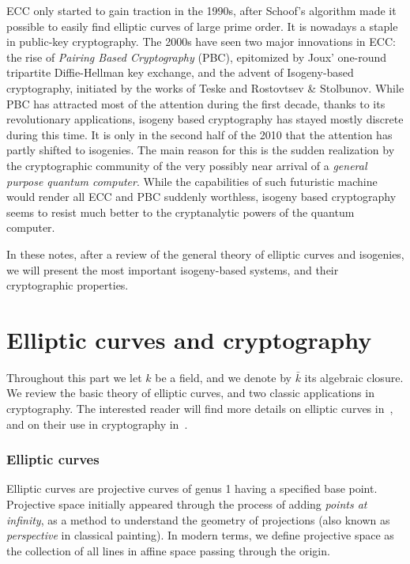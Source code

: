 \documentclass[10pt]{article}
\theoremstyle{plain}
\theoremstyle{definition}
\begin{document}
ECC only started to gain traction in the 1990s, after Schoof's
algorithm made it possible to easily find elliptic curves of large
prime order. %
It is nowadays a staple in public-key cryptography. %
The 2000s have seen two major innovations in ECC: the rise of
\emph{Pairing Based Cryptography} (PBC), epitomized by Joux' one-round
tripartite Diffie-Hellman key exchange, and the advent of
Isogeny-based cryptography, initiated by the works of Teske and
Rostovtsev \& Stolbunov. %
While PBC has attracted most of the attention during the first decade,
thanks to its revolutionary applications, isogeny based cryptography
has stayed mostly discrete during this time. %
It is only in the second half of the 2010 that the attention has
partly shifted to isogenies. %
The main reason for this is the sudden realization by the
cryptographic community of the very possibly near arrival of a
\emph{general purpose quantum computer}. %
While the capabilities of such futuristic machine would render all ECC
and PBC suddenly worthless, isogeny based cryptography seems to resist
much better to the cryptanalytic powers of the quantum computer.

In these notes, after a review of the general theory of elliptic
curves and isogenies, we will present the most important isogeny-based
systems, and their cryptographic properties.

{
  \hypersetup{linkcolor=black}
  \setcounter{tocdepth}{1}
  \tableofcontents
}


\clearpage
\part{Elliptic curves and cryptography}

Throughout this part we let $k$ be a field, and we denote by
$\bar{k}$ its algebraic closure. %
We review the basic theory of elliptic curves, and two classic
applications in cryptography. %
The interested reader will find more details on elliptic curves
in~\cite{silverman:elliptic}, and on their use in cryptography
in~\cite{joux2009algorithmic,galbraith2012mathematics}.

\section{Elliptic curves}

Elliptic curves are projective curves of genus 1 having a specified
base point. %
Projective space initially appeared through the process of adding
\emph{points at infinity}, as a method to understand the geometry of
projections (also known as \emph{perspective} in classical
painting). %
In modern terms, we define projective space as the collection of all
lines in affine space passing through the origin.
\end{document}
